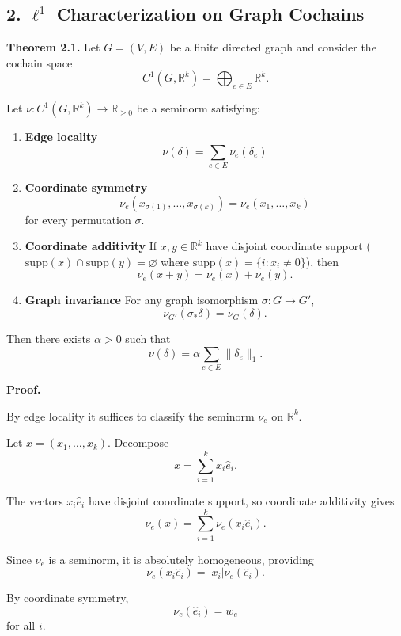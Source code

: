 \documentclass[
]{amsart}
\providecommand{\tightlist}{%
  \setlength{\itemsep}{0pt}\setlength{\parskip}{0pt}}
\begin{document}
\hypertarget{ell1-characterization-on-graph-cochains}{%
\subsection{\texorpdfstring{2. \(\ell^1\) Characterization on Graph
Cochains}{2. \textbackslash ell\^{}1 Characterization on Graph Cochains}}\label{ell1-characterization-on-graph-cochains}}

\textbf{Theorem 2.1.} Let \(G=(V,E)\) be a finite directed graph and
consider the cochain space
\[ C^1(G,\mathbb{R}^k)=\bigoplus_{e\in E}\mathbb{R}^k. \]

Let \(\nu:C^1(G,\mathbb{R}^k)\to\mathbb{R}_{\ge0}\) be a seminorm
satisfying:

\begin{enumerate}
\def\labelenumi{\arabic{enumi}.}
\tightlist
\item
  \textbf{Edge locality} \[ \nu(\delta)=\sum_{e\in E}\nu_e(\delta_e) \]
\item
  \textbf{Coordinate symmetry}
  \[ \nu_e(x_{\sigma(1)},\dots,x_{\sigma(k)}) = \nu_e(x_1,\dots,x_k) \]
  for every permutation \(\sigma\).
\item
  \textbf{Coordinate additivity} If \(x,y\in\mathbb{R}^k\) have disjoint
  coordinate support
  (\(\mathrm{supp}(x) \cap \mathrm{supp}(y) = \varnothing\) where
  \(\mathrm{supp}(x) = \{i : x_i \neq 0\}\)), then
  \[ \nu_e(x+y)=\nu_e(x)+\nu_e(y). \]
\item
  \textbf{Graph invariance} For any graph isomorphism
  \(\sigma:G\to G'\), \[ \nu_{G'}(\sigma_*\delta)=\nu_G(\delta). \]
\end{enumerate}

Then there exists \(\alpha > 0\) such that
\[ \nu(\delta)=\alpha\sum_{e\in E}\|\delta_e\|_1. \]

\textbf{Proof.}

By edge locality it suffices to classify the seminorm \(\nu_e\) on
\(\mathbb{R}^k\).

Let \(x=(x_1,\dots,x_k)\). Decompose \[ x=\sum_{i=1}^k x_i \hat{e}_i. \]

The vectors \(x_i \hat{e}_i\) have disjoint coordinate support, so
coordinate additivity gives
\[ \nu_e(x)=\sum_{i=1}^k\nu_e(x_i \hat{e}_i). \]

Since \(\nu_e\) is a seminorm, it is absolutely homogeneous, providing
\[ \nu_e(x_i \hat{e}_i)=|x_i|\nu_e(\hat{e}_i). \]

By coordinate symmetry, \[ \nu_e(\hat{e}_i)=w_e \] for all \(i\).
\end{document}
